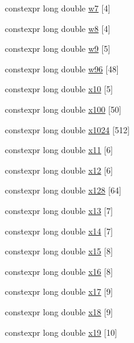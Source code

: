 \begin{DoxyCompactItemize}
constexpr long double \hyperlink{namespace____gnu__cxx_a82210f482d792394c592fd398294d6cb}{w7} \mbox{[}4\mbox{]}
\item 
constexpr long double \hyperlink{namespace____gnu__cxx_a64ce9fc76f8b3570a3e67468e028c380}{w8} \mbox{[}4\mbox{]}
\item 
constexpr long double \hyperlink{namespace____gnu__cxx_abd928434475ecfea20ea0fa4b9d65871}{w9} \mbox{[}5\mbox{]}
\item 
constexpr long double \hyperlink{namespace____gnu__cxx_a6cffee1d5cee8b67c34551ed5692d5c6}{w96} \mbox{[}48\mbox{]}
\item 
constexpr long double \hyperlink{namespace____gnu__cxx_a35531eb9204fa50829339f7eccad5608}{x10} \mbox{[}5\mbox{]}
\item 
constexpr long double \hyperlink{namespace____gnu__cxx_aee5c867dcae0fbf93848dfec3a7916ac}{x100} \mbox{[}50\mbox{]}
\item 
constexpr long double \hyperlink{namespace____gnu__cxx_a8e7f775ca42fef340881a24cd9ff921c}{x1024} \mbox{[}512\mbox{]}
\item 
constexpr long double \hyperlink{namespace____gnu__cxx_a44889c3e3daa2ff106fc46605e473274}{x11} \mbox{[}6\mbox{]}
\item 
constexpr long double \hyperlink{namespace____gnu__cxx_a4ddd5b95128414a528dcb27b9f282596}{x12} \mbox{[}6\mbox{]}
\item 
constexpr long double \hyperlink{namespace____gnu__cxx_addcb20ac8e8359cd8fe6d15138b92fe9}{x128} \mbox{[}64\mbox{]}
\item 
constexpr long double \hyperlink{namespace____gnu__cxx_a5aacbfdf56fd00ada1423197cb01a088}{x13} \mbox{[}7\mbox{]}
\item 
constexpr long double \hyperlink{namespace____gnu__cxx_af287aa3b6184d67e6d7aa2273acda544}{x14} \mbox{[}7\mbox{]}
\item 
constexpr long double \hyperlink{namespace____gnu__cxx_a68e1a5768f125278bd01010a8f0885ca}{x15} \mbox{[}8\mbox{]}
\item 
constexpr long double \hyperlink{namespace____gnu__cxx_a88fb54db835c7632b648c2882bf401af}{x16} \mbox{[}8\mbox{]}
\item 
constexpr long double \hyperlink{namespace____gnu__cxx_a733fb111a693485e01949cd6f5f2836e}{x17} \mbox{[}9\mbox{]}
\item 
constexpr long double \hyperlink{namespace____gnu__cxx_a1d3783e1b009706b624c1049e2c2accc}{x18} \mbox{[}9\mbox{]}
\item 
constexpr long double \hyperlink{namespace____gnu__cxx_af4018be16a87db2b88864f1904aca944}{x19} \mbox{[}10\mbox{]}

\end{DoxyCompactItemize}
